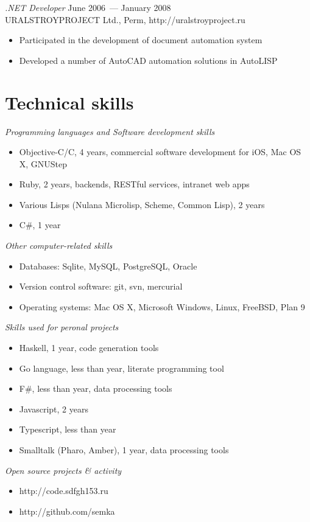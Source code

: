 \documentclass[12pt]{res}
\begin{document}
\begin{resume}
{\sl .NET Developer} \hfill June 2006~--- January 2008 \\
URALSTROYPROJECT Ltd., Perm, http://uralstroyproject.ru
\begin{itemize}
\item Participated in the development of document automation system
\item Developed a number of AutoCAD automation solutions in AutoLISP
\end{itemize}

\section{Technical skills} 

{\sl Programming languages and Software development skills} 
\begin{itemize}
\item Objective-C/C, 4 years, commercial software development for iOS, Mac OS X, GNUStep
\item Ruby, 2 years, backends, RESTful services, intranet web apps
\item Various Lisps (Nulana Microlisp, Scheme, Common Lisp), 2 years
\item C\#, 1 year
\end{itemize}

{\sl Other computer-related skills}
\begin{itemize}
\item Databases: Sqlite, MySQL, PostgreSQL, Oracle
\item Version control software: git, svn, mercurial
\item Operating systems: Mac OS X, Microsoft Windows, Linux, FreeBSD, Plan 9
\end{itemize} 

{\sl Skills used for peronal projects}
\begin{itemize}
\item Haskell, 1 year, code generation tools
\item Go language, less than year, literate programming tool
\item F\#, less than year, data processing tools
\item Javascript, 2 years
\item Typescript, less than year
\item Smalltalk (Pharo, Amber), 1 year, data processing tools
\end{itemize}

{\sl Open source projects \& activity}
\begin{itemize}
\item http://code.sdfgh153.ru
\item http://github.com/semka
\end{itemize}


\end{resume}
\end{document}
